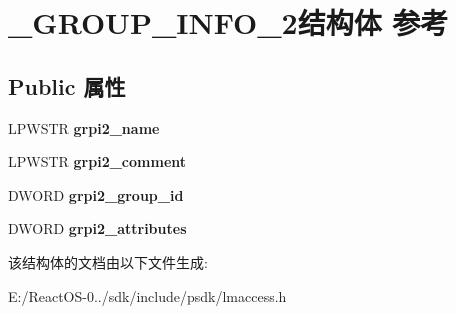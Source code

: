 \hypertarget{struct___g_r_o_u_p___i_n_f_o__2}{}\section{\+\_\+\+G\+R\+O\+U\+P\+\_\+\+I\+N\+F\+O\+\_\+2结构体 参考}
\label{struct___g_r_o_u_p___i_n_f_o__2}
\subsection*{Public 属性}
\begin{DoxyCompactItemize}
\item 
\mbox{\label{struct___g_r_o_u_p___i_n_f_o__2_af98d098bb9926bc21f756437ac0e7946}} 
L\+P\+W\+S\+TR {\bfseries grpi2\+\_\+name}
\item 
\mbox{\label{struct___g_r_o_u_p___i_n_f_o__2_a6fd0882922161057a3d13a71b7810200}} 
L\+P\+W\+S\+TR {\bfseries grpi2\+\_\+comment}
\item 
\mbox{\label{struct___g_r_o_u_p___i_n_f_o__2_a92514dcb9ee7fbbecbf4dd41bb415202}} 
D\+W\+O\+RD {\bfseries grpi2\+\_\+group\+\_\+id}
\item 
\mbox{\label{struct___g_r_o_u_p___i_n_f_o__2_ae94a16ac0a23170641f8763eae6d86ba}} 
D\+W\+O\+RD {\bfseries grpi2\+\_\+attributes}
\end{DoxyCompactItemize}


该结构体的文档由以下文件生成\+:\begin{DoxyCompactItemize}
\item 
E\+:/\+React\+O\+S-\/0../sdk/include/psdk/lmaccess.\+h\end{DoxyCompactItemize}
